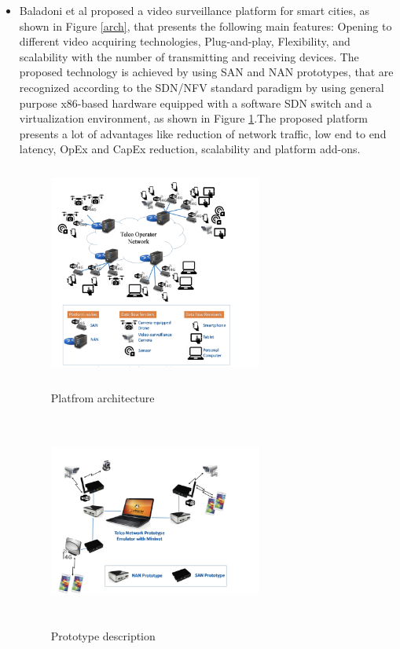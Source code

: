 \documentclass[12pt]{article}
\begin{document}
\begin{itemize}
\item Baladoni et al\cite{7983190} proposed a video surveillance platform for smart cities, as shown in Figure \ref{arch}, that presents the following main features: Opening to different video acquiring technologies, Plug-and-play, Flexibility, and scalability with the number of transmitting and receiving devices. The proposed technology is achieved by using SAN and NAN prototypes, that are recognized according to the SDN/NFV standard paradigm by using general purpose x86-based hardware equipped with a software SDN switch and a virtualization environment, as shown in Figure \ref{Desc}.The proposed platform presents a lot of advantages like reduction of network traffic, low end to end latency, OpEx and CapEx reduction, scalability and platform add-ons.


\begin{figure}[!ht]
 \begin{minipage}{.5\textwidth}
  \includegraphics[width=7.0cm, height=7.0cm]{./10.png}
  \caption{Platfrom architecture}
  \label{arch}
 \end{minipage}
  \begin{minipage}{.5\textwidth}
  \includegraphics[width=7.0cm, height=7.0cm]{./11.png}
  \caption{Prototype description}
  \label{Desc}
 \end{minipage}
\end{figure}


\end{itemize}
\end{document}
